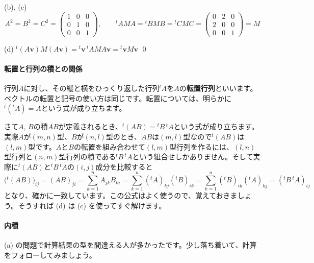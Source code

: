 \noindent (b), (c)
\[
A^2 = 
B^2 = 
C^2 = 
\begin{pmatrix}
1 & 0 & 0 \\
0 & 1 & 0 \\
0 & 0 & 1
\end{pmatrix}
, \qquad
{}^t\! AMA = 
{}^t BMB = 
{}^t CMC =
\begin{pmatrix}
0 & 2 & 0 \\
2 & 0 & 0 \\
0 & 0 & 1
\end{pmatrix}
= M
\]

\noindent(d) ${}^t(A\bm{v})M(A\bm{v}) = {}^t\bm{v}\,{}^t \! AMA\bm{v} = {}^t\bm{v}M\bm{v}$ \qed


\paragraph{転置と行列の積との関係}

行列$A$に対し、その縦と横をひっくり返した行列${}^t\! A$を$A$の\textbf{転置行列}といいます。ベクトルの転置と記号の使い方は同じです。転置については、明らかに${}^t({}^t A)= A$という式が成り立ちます。

さて$A$, $B$の積$AB$が定義されるとき、${}^t(AB) = {}^t B\, {}^t\!A$という式が成り立ちます。実際$A$が$(m, n)$型、$B$が$(n, l)$型のとき、$AB$は$(m, l)$型なので${}^t(AB)$は$(l, m)$型です。$A$と$B$の転置を組み合わせて$(l, m)$型行列を作るには、$(l,n)$型行列と$(n,m)$型行列の積である${}^tB\, {}^t\! A$という組合せしかありません。そして実際に${}^t(AB)$と${}^t B\, {}^t\! A$の$(i, j)$成分を比較すると
\[
\bigl({}^t(AB)\bigr)_{ij} = (AB)_{ji} = \sum_{k = 1}^n A_{jk} B_{ki} = \sum_{k = 1}^n ({}^t\! A)_{kj} ({}^t B)_{ik}
= \sum_{k = 1}^n ({}^t B)_{ik} ({}^t\! A)_{kj} = ({}^t B\, {}^t\! A)_{ij}
\]
となり、確かに一致しています。この公式はよく使うので、覚えておきましょう。そうすれば (d) は (c) を使ってすぐ解けます。

\paragraph{内積}

(a) の問題で計算結果の型を間違える人が多かったです。少し落ち着いて、計算をフォローしてみましょう。

